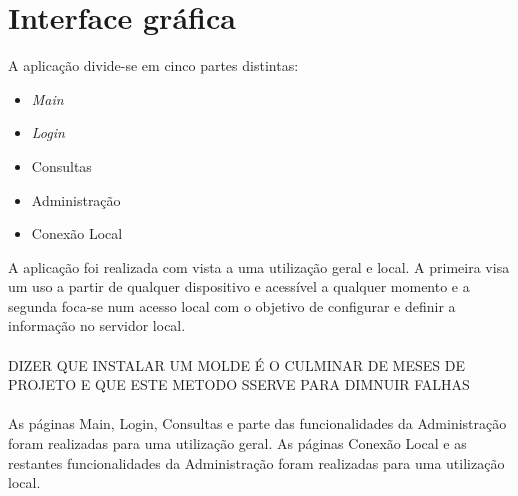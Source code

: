 \documentclass[11pt,twoside,a4paper]{report}
\begin{document}
\section{Interface gráfica}
A aplicação divide-se em cinco partes distintas:
\begin{itemize}
	\item \textit{Main}
	\item \textit{Login}
	\item Consultas
	\item Administração
	\item Conexão Local
\end{itemize}
A aplicação foi realizada com vista a uma utilização geral e local. A primeira visa um uso a partir de qualquer dispositivo e acessível a qualquer momento e a segunda foca-se num acesso local com o objetivo de configurar e definir a informação no servidor local.\\
\\
DIZER QUE INSTALAR UM MOLDE É O CULMINAR DE MESES DE PROJETO E QUE ESTE METODO SSERVE PARA DIMNUIR FALHAS\\
\\
As páginas Main, Login, Consultas e parte das funcionalidades da Administração foram realizadas para uma utilização geral. As páginas Conexão Local e as restantes funcionalidades da Administração foram realizadas para uma utilização local.
\end{document}
